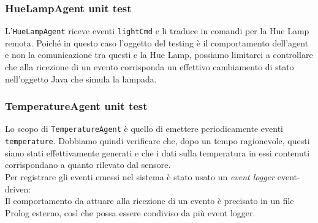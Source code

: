 \documentclass{../llncs}
\newcommand{\codescript}[1]{{\mbox{\small{\texttt{#1}}}}\xspace}
\begin{document}


\subsubsection{HueLampAgent unit test}
L'\codescript{HueLampAgent} riceve eventi \codescript{lightCmd} e li traduce in comandi per la Hue Lamp remota. Poiché in questo caso l'oggetto del testing è il comportamento dell'agent e non la comunicazione tra questi e la Hue Lamp, possiamo limitarci a controllare che alla ricezione di un evento corrisponda un effettivo cambiamento di stato nell'oggetto Java che simula la lampada.\\



\subsubsection{TemperatureAgent unit test}
Lo scopo di \codescript{TemperatureAgent} è quello di emettere periodicamente eventi \codescript{temperature}. Dobbiamo quindi verificare che, dopo un tempo ragionevole, questi siano stati effettivamente generati e che i dati sulla temperatura in essi contenuti corrispondano a quanto rilevato dal sensore.\\



Per registrare gli eventi emessi nel sistema è stato usato un \emph{event logger} event-driven:\\





Il comportamento da attuare alla ricezione di un evento è precisato in un file Prolog esterno, così che possa essere condiviso da più event logger.\\


\end{document}
